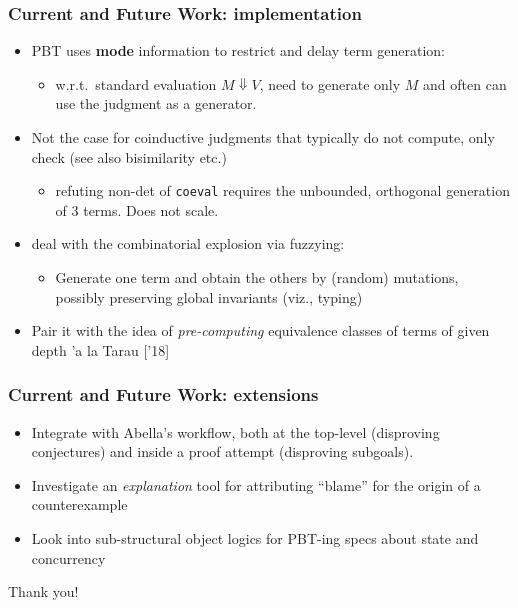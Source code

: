 \documentclass{beamer}
\newcommand{\red}[1]{{\color{red} #1}}
\newenvironment{myslide}[1]
    {\begin{frame}\frametitle{#1}}
    {\end{frame}}
\begin{document}
\begin{myslide}{Current and Future Work: implementation}
  \begin{itemize}
  \item PBT uses \textbf{mode} information to restrict and delay term generation:
    \begin{itemize}
    \item w.r.t.\ standard evaluation $M\Downarrow V$,  need to generate only $M$ and often can use the judgment  as a generator.
    \end{itemize}
  \item Not the case for coinductive judgments that typically do not compute, only check (see also bisimilarity etc.)
    \begin{itemize}
    \item refuting non-det of \texttt{coeval} requires the unbounded, orthogonal generation of 3 terms. Does not scale.
    \end{itemize}
    \pause
  \item deal with the combinatorial explosion via \red{fuzzying}:
    \begin{itemize}
    \item Generate one term and obtain the others by (random)
      mutations, possibly preserving global invariants (viz.,
      typing) %
    \end{itemize}
  \item Pair it with the idea of \emph{pre-computing} equivalence
    classes of terms of given depth 'a la Tarau ['18]
  \end{itemize}
  \end{myslide}
\begin{myslide}{Current and Future Work: extensions}
  \begin{itemize}
  \item Integrate with Abella's workflow, both at the top-level
    (disproving conjectures) and inside a proof attempt (disproving
    subgoals).    
\item  Investigate an \emph{explanation} tool for attributing ``blame'' for
the origin of a counterexample
  \item Look into sub-structural object logics for PBT-ing specs about state and concurrency
  \end{itemize}
\end{myslide}
\begin{frame}
  \begin{center}
    \begin{LARGE}
      Thank you!
    \end{LARGE}
  \end{center}

\end{frame}
\end{document}
